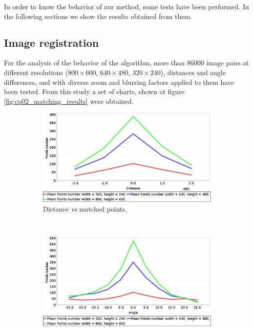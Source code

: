 In order to know the behavior of our method, some tests have been performed. In the following sections we show the results obtained from them.

\subsection{Image registration}\label{ch:chapter02_02_01}

For the analysis of the behavior of the algorithm, more than 86000 image pairs at different resolutions ($800 \times 600$, $640 \times 480$, $320 \times 240$), distances and angle differences, and with diverse zoom and blurring factors applied to them have been tested. From this study a set of charts, shown at figure \ref{fig:cp02_matching_results} were obtained.

\begin{figure}[h!]
        \centering
        \begin{subfigure}[b]{0.45\textwidth}
	    \includegraphics[width=\textwidth]{distVsMatches}
	  \caption{Distance \emph{vs} matched points.}\label{fig:cp02_distance_vs_matched}
        \end{subfigure}%
        ~
        \begin{subfigure}[b]{0.45\textwidth}
	    \includegraphics[width=\textwidth]{angleVsMatches}

\end{subfigure}
\end{figure}
